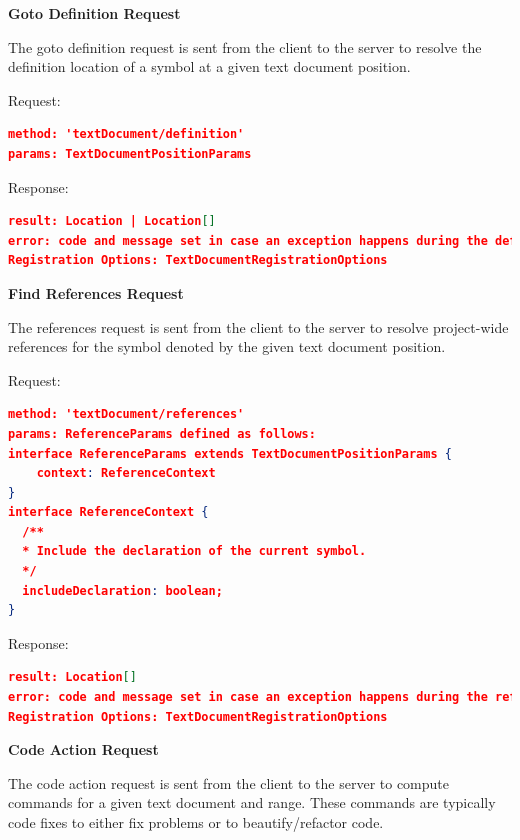 \textbf{Goto Definition Request}

The goto definition request is sent from the client to the server to resolve the definition location of a symbol at a given text document position.

Request:
\begin{lstlisting}[language=json,firstnumber=1]
method: 'textDocument/definition'
params: TextDocumentPositionParams
\end{lstlisting}

Response:
\begin{lstlisting}[language=json,firstnumber=1]
result: Location | Location[]
error: code and message set in case an exception happens during the definition request.
Registration Options: TextDocumentRegistrationOptions
\end{lstlisting}

\textbf{Find References Request}

The references request is sent from the client to the server to resolve project-wide references for the symbol denoted by the given text document position.

Request:
\begin{lstlisting}[language=json,firstnumber=1]
method: 'textDocument/references'
params: ReferenceParams defined as follows:
interface ReferenceParams extends TextDocumentPositionParams {
	context: ReferenceContext
}
interface ReferenceContext {
  /**
  * Include the declaration of the current symbol.
  */
  includeDeclaration: boolean;
}
\end{lstlisting}
Response:
\begin{lstlisting}[language=json,firstnumber=1]
result: Location[]
error: code and message set in case an exception happens during the reference request.
Registration Options: TextDocumentRegistrationOptions
\end{lstlisting}

\textbf{Code Action Request}

The code action request is sent from the client to the server to compute commands for a given text document and range. These commands are typically code fixes to either fix problems or to beautify/refactor code.

